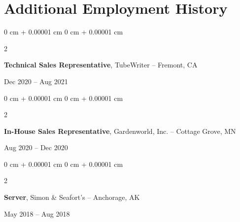 \documentclass[10pt, letterpaper]{article}
\newenvironment{onecolentry}{
    \begin{adjustwidth}{
        0 cm + 0.00001 cm
    }{
        0 cm + 0.00001 cm
    }
}{
    \end{adjustwidth}
} %
\newenvironment{twocolentry}[2][]{
    \onecolentry
    \def\secondColumn{#2}
    \setcolumnwidth{\fill, 4.5 cm}
    \begin{paracol}{2}
}{
    \switchcolumn \raggedleft \secondColumn
    \end{paracol}
    \endonecolentry
} %
\begin{document}
%
%            
%
%                

        


    \section{Additional Employment History}




        \begin{samepage} 
            \begin{twocolentry}{
                Dec 2020 – Aug 2021
                }
                \textbf{Technical Sales Representative}, TubeWriter -- Fremont, CA
            \end{twocolentry}
        \end{samepage}  


        \vspace{0.2 cm}


        \begin{samepage} 
            \begin{twocolentry}{
                Aug 2020 – Dec 2020
                }
                \textbf{In-House Sales Representative}, Gardenworld, Inc. -- Cottage Grove, MN
            \end{twocolentry}
        \end{samepage}  


        \vspace{0.2 cm}


        \begin{samepage} 
            \begin{twocolentry}{
                May 2018 – Aug 2018
                }
                \textbf{Server}, Simon \& Seafort's -- Anchorage, AK
            \end{twocolentry}
        \end{samepage}  
\end{document}
